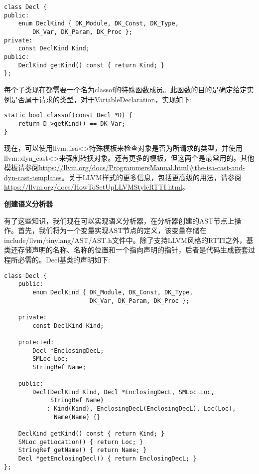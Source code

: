 \begin{lstlisting}[caption={}]
class Decl {
public:
	enum DeclKind { DK_Module, DK_Const, DK_Type,
		DK_Var, DK_Param, DK_Proc };
private:
	const DeclKind Kind;
public:
	DeclKind getKind() const { return Kind; }
};
\end{lstlisting}

每个子类现在都需要一个名为classof的特殊函数成员。此函数的目的是确定给定实例是否属于请求的类型，对于VariableDeclaration，实现如下:\par

\begin{lstlisting}[caption={}]
static bool classof(const Decl *D) {
	return D->getKind() == DK_Var;
}
\end{lstlisting}

现在，可以使用llvm::isa<>特殊模板来检查对象是否为所请求的类型，并使用llvm::dyn\underline{~}cast<>来强制转换对象。还有更多的模板，但这两个是最常用的。其他模板请参阅\url{https://llvm.org/docs/ProgrammersManual.html\#the-isa-cast-and-dyn-cast-templates}。关于LLVM样式的更多信息，包括更高级的用法，请参阅\url{https://llvm.org/docs/HowToSetUpLLVMStyleRTTI.html}。\par

\hspace*{\fill} \par %
\textbf{创建语义分析器}

有了这些知识，我们现在可以实现语义分析器，在分析器创建的AST节点上操作。首先，我们将为一个变量实现AST节点的定义，该变量存储在include/llvm/tinylang/AST/AST.h文件中。除了支持LLVM风格的RTTI之外，基类还存储声明的名称、名称的位置和一个指向声明的指针，后者是代码生成嵌套过程所必需的。Decl基类的声明如下:\par

\begin{lstlisting}[caption={}]
class Decl {
	public:
		enum DeclKind { DK_Module, DK_Const, DK_Type,
						DK_Var, DK_Param, DK_Proc };
	
	private:
		const DeclKind Kind;
		
	protected:
		Decl *EnclosingDecL;
		SMLoc Loc;
		StringRef Name;
		
	public:
		Decl(DeclKind Kind, Decl *EnclosingDecL, SMLoc Loc,
			 StringRef Name)
			: Kind(Kind), EnclosingDecL(EnclosingDecL), Loc(Loc),
			  Name(Name) {}
	
	DeclKind getKind() const { return Kind; }
	SMLoc getLocation() { return Loc; }
	StringRef getName() { return Name; }
	Decl *getEnclosingDecl() { return EnclosingDecL; }
};
\end{lstlisting}


